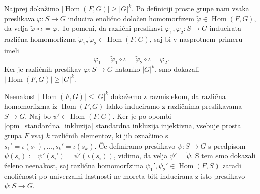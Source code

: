 \begin{dokaz}
  Najprej dokažimo $\lvert \operatorname{Hom}(F, G) \rvert \ge \lvert G \rvert^{k}$.
Po definiciji proste grupe nam vsaka preslikava $\varphi: S \to  G$ inducira enolično določen homomorfizem $\tilde{\varphi} \in \operatorname{Hom}(F, G)$, da velja $\tilde{\varphi} \circ  \iota = \varphi$.
To pomeni, da različni preslikavi $\varphi_1, \varphi_2 : S \to  G$ inducirata različna homomorfizma $\tilde{\varphi}_1 , \tilde{\varphi}_2 \in \operatorname{Hom}(F, G)$, saj bi v nasprotnem primeru imeli \begin{equation*}
\varphi_1 = \tilde{\varphi}_1 \circ  \iota = \tilde{\varphi}_2 \circ  \iota = \varphi_2.
\end{equation*}  
Ker je različnih preslikav $\varphi : S \to G$ natanko $\lvert G \rvert^{k}$, smo dokazali $\lvert \operatorname{Hom}(F, G) \rvert \ge \lvert G \rvert^{k}$.

Neenakost $\lvert \operatorname{Hom}(F, G) \rvert \le \lvert G \rvert^{k}$ dokažemo z razmislekom, da različna homomorfizma iz $\operatorname{Hom}(F, G)$ lahko induciramo z različnima preslikavama $S \to G$.
Naj bo $\psi' \in \operatorname{Hom}(F, G)$. Ker je po opombi \ref{opm_standardna_inkluzija} standardna inkluzija injektivna, vsebuje prosta grupa $F$ vsaj $k$ različnih elementov, ki jih označimo s $s_1' = \iota(s_1), \ldots, s_k' = \iota(s_k)$.
Če definiramo preslikavo $\psi : S \to G$ s predpisom $\psi(s_i) := \psi'(s_i') = \psi'(\iota(s_i))$, vidimo, da velja $\psi' = \tilde{\psi}$. S tem smo dokazali želeno neenakost, saj različna homomorfzima $\psi_1', \psi_2' \in  \operatorname{Hom}(F, S)$ zaradi enoličnosti po univerzalni lastnosti ne moreta biti
inducirana z isto preslikavo $\psi : S \to  G$.
\end{dokaz}


